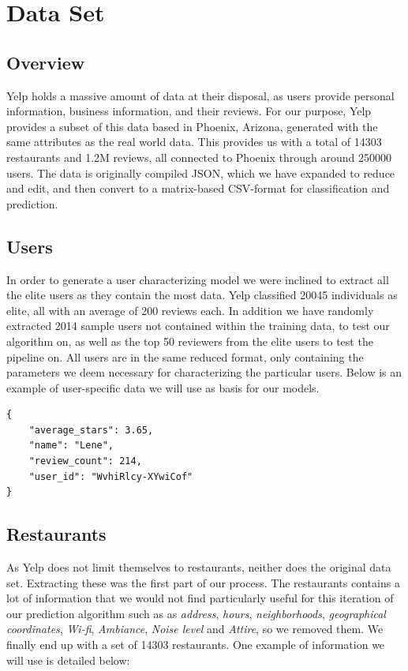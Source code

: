 \documentclass[10pt,twocolumn,letterpaper]{article}
\begin{document}

\section{Data Set}

\subsection{Overview}
Yelp holds a massive amount of data at their disposal, as users provide personal information, business information, and their reviews. For our purpose, Yelp provides a subset of this data based in Phoenix, Arizona, generated with the same attributes as the real world data. This provides us with a total of 14303 restaurants and 1.2M reviews, all connected to Phoenix through around 250000 users. The data is originally compiled JSON, which we have expanded to reduce and edit, and then convert to a matrix-based CSV-format for classification and prediction.

\subsection{Users}
In order to generate a user characterizing model we were inclined to extract all the elite users as they contain the most data. Yelp classified 20045 individuals as elite, all with an average of 200 reviews each. In addition we have randomly extracted 2014 sample users not contained within the training data, to test our algorithm on, as well as the top 50 reviewers from the elite users to test the pipeline on. All users are in the same reduced format, only containing the parameters we deem necessary for characterizing the particular users. Below is an example of user-specific data we will use as basis for our models.

\begin{verbatim}
{
    "average_stars": 3.65,
    "name": "Lene",
    "review_count": 214,
    "user_id": "WvhiRlcy-XYwiCof"
}
\end{verbatim}

\subsection{Restaurants}
As Yelp does not limit themselves to restaurants, neither does the original data set. Extracting these was the first part of our process. The restaurants contains a lot of information that we would not find particularly useful for this iteration of our prediction algorithm such as as \textit{address}, \textit{hours}, \textit{neighborhoods}, \textit{geographical coordinates}, \textit{Wi-fi}, \textit{Ambiance}, \textit{Noise level} and \textit{Attire}, so we removed them. We finally end up with a set of 14303 restaurants. One example of information we will use is detailed below:
\end{document}
